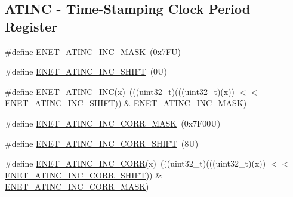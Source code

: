 \subsection*{A\+T\+I\+NC -\/ Time-\/\+Stamping Clock Period Register}
\begin{DoxyCompactItemize}
\item 
\#define \mbox{\hyperlink{group___e_n_e_t___register___masks_ga658c4082b327e6291ea190f5d2e7b8b6}{E\+N\+E\+T\+\_\+\+A\+T\+I\+N\+C\+\_\+\+I\+N\+C\+\_\+\+M\+A\+SK}}~(0x7\+F\+U)
\item 
\#define \mbox{\hyperlink{group___e_n_e_t___register___masks_ga876ed9c5bafbfc5e251c600dc3b1af58}{E\+N\+E\+T\+\_\+\+A\+T\+I\+N\+C\+\_\+\+I\+N\+C\+\_\+\+S\+H\+I\+FT}}~(0\+U)
\item 
\#define \mbox{\hyperlink{group___e_n_e_t___register___masks_ga8d15793d8ec37eb9f5c397303276da52}{E\+N\+E\+T\+\_\+\+A\+T\+I\+N\+C\+\_\+\+I\+NC}}(x)~(((uint32\+\_\+t)(((uint32\+\_\+t)(x)) $<$$<$ \mbox{\hyperlink{group___e_n_e_t___register___masks_ga876ed9c5bafbfc5e251c600dc3b1af58}{E\+N\+E\+T\+\_\+\+A\+T\+I\+N\+C\+\_\+\+I\+N\+C\+\_\+\+S\+H\+I\+FT}})) \& \mbox{\hyperlink{group___e_n_e_t___register___masks_ga658c4082b327e6291ea190f5d2e7b8b6}{E\+N\+E\+T\+\_\+\+A\+T\+I\+N\+C\+\_\+\+I\+N\+C\+\_\+\+M\+A\+SK}})
\item 
\#define \mbox{\hyperlink{group___e_n_e_t___register___masks_gad06628842cadf9dd5423d8bc31c32745}{E\+N\+E\+T\+\_\+\+A\+T\+I\+N\+C\+\_\+\+I\+N\+C\+\_\+\+C\+O\+R\+R\+\_\+\+M\+A\+SK}}~(0x7\+F00\+U)
\item 
\#define \mbox{\hyperlink{group___e_n_e_t___register___masks_ga804dc6e92567b82a7f104c250841d03d}{E\+N\+E\+T\+\_\+\+A\+T\+I\+N\+C\+\_\+\+I\+N\+C\+\_\+\+C\+O\+R\+R\+\_\+\+S\+H\+I\+FT}}~(8\+U)
\item 
\#define \mbox{\hyperlink{group___e_n_e_t___register___masks_gab460295776472a46a57f683ee98f1928}{E\+N\+E\+T\+\_\+\+A\+T\+I\+N\+C\+\_\+\+I\+N\+C\+\_\+\+C\+O\+RR}}(x)~(((uint32\+\_\+t)(((uint32\+\_\+t)(x)) $<$$<$ \mbox{\hyperlink{group___e_n_e_t___register___masks_ga804dc6e92567b82a7f104c250841d03d}{E\+N\+E\+T\+\_\+\+A\+T\+I\+N\+C\+\_\+\+I\+N\+C\+\_\+\+C\+O\+R\+R\+\_\+\+S\+H\+I\+FT}})) \& \mbox{\hyperlink{group___e_n_e_t___register___masks_gad06628842cadf9dd5423d8bc31c32745}{E\+N\+E\+T\+\_\+\+A\+T\+I\+N\+C\+\_\+\+I\+N\+C\+\_\+\+C\+O\+R\+R\+\_\+\+M\+A\+SK}})
\end{DoxyCompactItemize}
